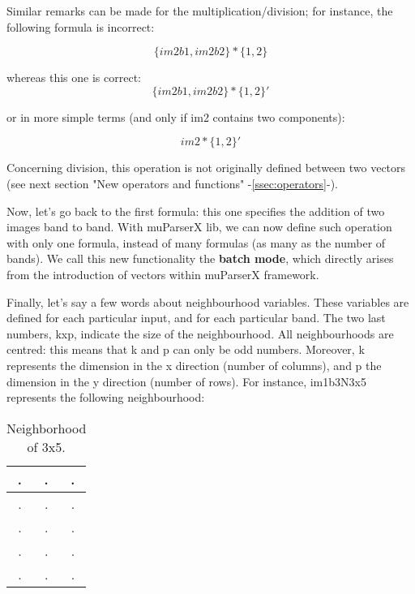 Similar remarks can be made for the multiplication/division; 
for instance, the following formula is incorrect:

\begin{equation}
  \{im2b1,im2b2\} * \{1,2\}
\end{equation}

whereas this one is correct:
\begin{equation}
  \{im2b1,im2b2\} * \{1,2\}'
\end{equation}

or in more simple terms (and only if im2 contains two components): 

\begin{equation}
  im2* \{1,2\}'
\end{equation}

Concerning division, this operation is not originally defined between 
two vectors (see next section "New operators and functions" -\ref{ssec:operators}-).

\begin{center}
\end{center}

Now, let's go back to the first formula: this one specifies the addition 
of two images band to band. With muParserX lib, we can now define such 
operation with only one formula, instead of many formulas (as many as 
the number of bands). We call this new functionality the \textbf{batch mode}, 
which directly arises from the introduction of vectors within muParserX framework.

Finally, let's say a few words about neighbourhood variables. 
These variables are defined for each particular input, and for each 
particular band. The two last numbers, kxp, indicate the size of the 
neighbourhood. All neighbourhoods are centred: this means that k and p 
can only be odd numbers. Moreover, k represents the dimension in the 
x direction (number of columns), and p the dimension in the y direction 
(number of rows). For instance, im1b3N3x5 represents the following 
neighbourhood: 

\begin{center}
\begin{table}
\begin{tabular}{|c|c|c|}
\hline
.	& .	& . \\
\hline
.	& .	& . \\
\hline
.	& .	& . \\
\hline
.	& .	& . \\
\hline
.	& .	& . \\
\hline
\end{tabular}
\caption{Neighborhood of 3x5.}
\label{correctness}
\end{table}
\end{center}

